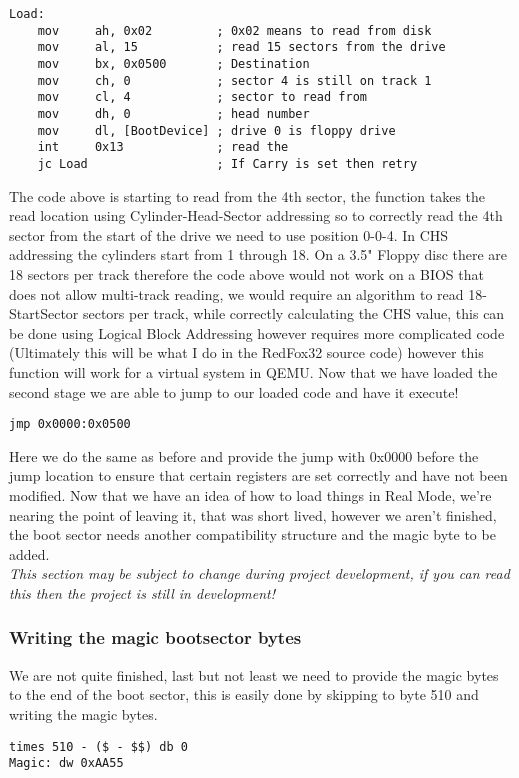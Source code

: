 \documentclass[10pt,a4paper]{article}
\begin{document}
\newpage

\begin{verbatim}
Load:
    mov     ah, 0x02         ; 0x02 means to read from disk
    mov     al, 15           ; read 15 sectors from the drive
    mov     bx, 0x0500       ; Destination
    mov     ch, 0            ; sector 4 is still on track 1
    mov     cl, 4            ; sector to read from
    mov     dh, 0            ; head number
    mov     dl, [BootDevice] ; drive 0 is floppy drive
    int     0x13             ; read the
    jc Load                  ; If Carry is set then retry
\end{verbatim}

The code above is starting to read from the 4th sector, the function takes the read location using Cylinder-Head-Sector addressing so to correctly read the 4th sector from the start of the drive we need to use position 0-0-4. In CHS addressing the cylinders start from 1 through 18. On a 3.5" Floppy disc there are 18 sectors per track therefore the code above would not work on a BIOS that does not allow multi-track reading, we would require an algorithm to read 18-StartSector sectors per track, while correctly calculating the CHS value, this can be done using Logical Block Addressing however requires more complicated code (Ultimately this will be what I do in the RedFox32 source code) however this function will work for a virtual system in QEMU. Now that we have loaded the second stage we are able to jump to our loaded code and have it execute!
\begin{verbatim}
jmp 0x0000:0x0500
\end{verbatim}
Here we do the same as before and provide the jump with 0x0000 before the jump location to ensure that certain registers are set correctly and have not been modified. Now that we have an idea of how to load things in Real Mode, we're nearing the point of leaving it, that was short lived, however we aren't finished, the boot sector needs another compatibility structure and the magic byte to be added. \medskip \\
\textit{This section may be subject to change during project development, if you can read this then the project is still in development!}

\subsubsection{Writing the magic bootsector bytes}
We are not quite finished, last but not least we need to provide the magic bytes to the end of the boot sector, this is easily done by skipping to byte 510 and writing the magic bytes.
\begin{verbatim}
times 510 - ($ - $$) db 0
Magic: dw 0xAA55
\end{verbatim}
\end{document}
